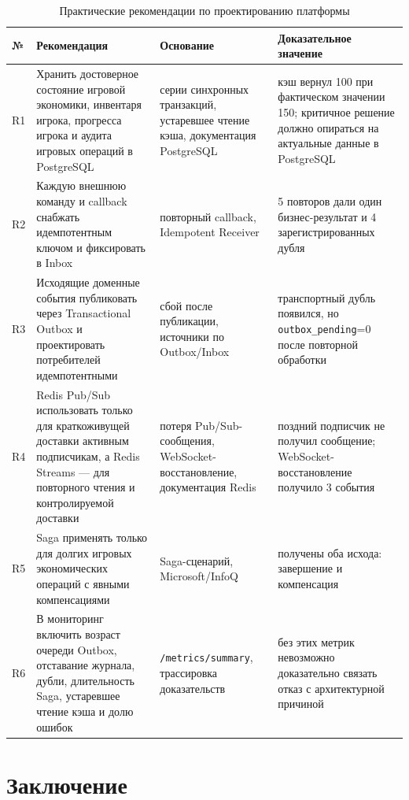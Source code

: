 \documentclass[a4paper,14pt]{extarticle}
\newcommand{\tablefont}{\scriptsize}
\renewcommand{\toprule}{\hline}
\renewcommand{\midrule}{\hline}
\renewcommand{\bottomrule}{\hline}
\numberwithin{figure}{section}
\numberwithin{table}{section}
\begin{document}
\begin{table}[H]
\centering
\caption{Практические рекомендации по проектированию платформы}
\label{tab:recommendations-main}
\tablefont
\setlength{\tabcolsep}{2pt}
\renewcommand{\arraystretch}{1.12}
\begin{tabular}{|L{0.9cm}|L{5.8cm}|L{3.8cm}|L{4.4cm}|}
\toprule
№ & Рекомендация & Основание & Доказательное значение \\
\midrule
R1 & Хранить достоверное состояние игровой экономики, инвентаря игрока, прогресса игрока и аудита игровых операций в PostgreSQL & серии синхронных транзакций, устаревшее чтение кэша, документация PostgreSQL & кэш вернул 100 при фактическом значении 150; критичное решение должно опираться на актуальные данные в PostgreSQL \\
\hline
R2 & Каждую внешнюю команду и callback снабжать идемпотентным ключом и фиксировать в Inbox & повторный callback, Idempotent Receiver & 5 повторов дали один бизнес-результат и 4 зарегистрированных дубля \\
\hline
R3 & Исходящие доменные события публиковать через Transactional Outbox и проектировать потребителей идемпотентными & сбой после публикации, источники по Outbox/Inbox & транспортный дубль появился, но \texttt{outbox\_pending}=0 после повторной обработки \\
\hline
R4 & Redis Pub/Sub использовать только для краткоживущей доставки активным подписчикам, а Redis Streams --- для повторного чтения и контролируемой доставки & потеря Pub/Sub-сообщения, WebSocket-восстановление, документация Redis & поздний подписчик не получил сообщение; WebSocket-восстановление получило 3 события \\
\hline
R5 & Saga применять только для долгих игровых экономических операций с явными компенсациями & Saga-сценарий, Microsoft/InfoQ & получены оба исхода: завершение и компенсация \\
\hline
R6 & В мониторинг включить возраст очереди Outbox, отставание журнала, дубли, длительность Saga, устаревшее чтение кэша и долю ошибок & \texttt{/metrics/summary}, трассировка доказательств & без этих метрик невозможно доказательно связать отказ с архитектурной причиной \\
\bottomrule
\end{tabular}
\end{table}

\clearpage
\section{Заключение}
\label{sec:conclusion}
\end{document}
